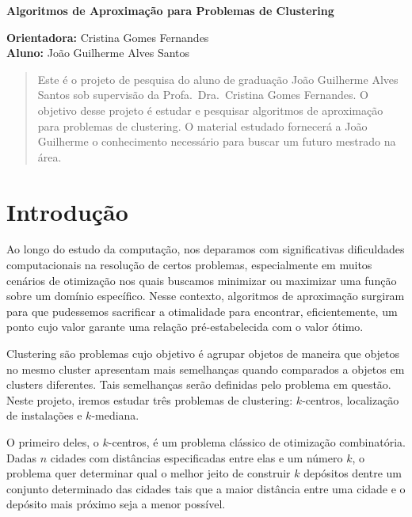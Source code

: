 \documentclass[12pt]{article}
\begin{document}
\begin{center}
  
{\Large {\bf Algoritmos de Aproximação para Problemas de Clustering}
}

\vspace{0.2cm}
{\small 
{\bf Orientadora:} Cristina Gomes Fernandes \\
{\bf Aluno:} João Guilherme Alves Santos
}

\vspace{5mm} 

\begin{abstract}
Este é o projeto de pesquisa do aluno de graduação João Guilherme Alves Santos sob supervisão da Profa.\ Dra.\ Cristina Gomes Fernandes. O objetivo desse projeto é estudar e pesquisar algoritmos de aproximação para problemas de clustering. O material estudado fornecerá a João Guilherme o conhecimento necessário para buscar um futuro mestrado na área.
\end{abstract}

\end{center}
\newpage

\tableofcontents

\newpage

\section{Introdução}

Ao longo do estudo da computação, nos deparamos com significativas dificuldades computacionais na resolução de certos problemas, especialmente em muitos cenários de otimização nos quais buscamos minimizar ou maximizar uma função sobre um domínio específico. Nesse contexto, algoritmos de aproximação surgiram para que pudessemos sacrificar a otimalidade para encontrar, eficientemente, um ponto cujo valor garante uma relação pré-estabelecida com o valor ótimo.

Clustering são problemas cujo objetivo é agrupar objetos de maneira que objetos no mesmo cluster apresentam mais semelhanças quando comparados a objetos em clusters diferentes. Tais semelhanças serão definidas pelo problema em questão. Neste projeto, iremos estudar três problemas de clustering: $k$-centros, localização de instalações e $k$-mediana. 



O primeiro deles, o $k$-centros, é um problema clássico de otimização combinatória. Dadas $n$ cidades com distâncias especificadas entre elas e um número $k$, o problema quer determinar qual o melhor jeito de construir $k$ depósitos dentre um conjunto determinado das cidades tais que a maior distância entre uma cidade e o depósito mais próximo seja a menor possível.
\end{document}
